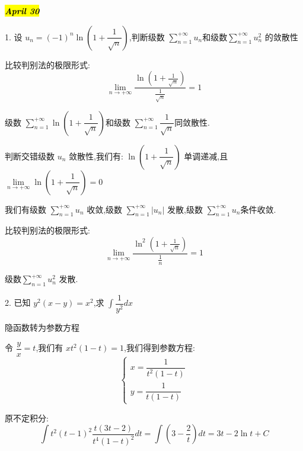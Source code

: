 
\hl{\textbf{\textit{April 30}}}

1. 设 $u_{n}=(-1)^{n}\ln(1+\dfrac{1}{\sqrt{n}})$,判断级数 $\sum\limits_{n=1}^{+\infty}u_{n}$和级数$\sum\limits_{n=1}^{+\infty}u^{2}_{n}$ 的敛散性
\begin{solution}
	
	比较判别法的极限形式: 
	$$\lim\limits_{n\rightarrow +\infty}\frac{\ln(1+\frac{1}{\sqrt{n}})}{\frac{1}{\sqrt{n}}}=1$$
	
	级数 $\sum\limits_{n=1}^{+\infty}\ln(1+\dfrac{1}{\sqrt{n}})$和级数 $\sum\limits_{n=1}^{+\infty}\dfrac{1}{\sqrt{n}}$同敛散性.
	
	判断交错级数 $u_{n}$ 敛散性,我们有: $\ln(1+\dfrac{1}{\sqrt{n}})$ 单调递减,且 $\lim\limits_{n\rightarrow+\infty}\ln(1+\dfrac{1}{\sqrt{n}})=0$
	
	我们有级数 $\sum\limits_{n=1}^{+\infty}u_{n}$ 收敛,级数 $\sum\limits_{n=1}^{+\infty}|u_{n}|$ 发散,级数 $\sum\limits_{n=1}^{+\infty}u_{n}$条件收敛.
	
	比较判别法的极限形式: 
	$$\lim\limits_{n\rightarrow +\infty}\frac{\ln^{2}(1+\frac{1}{\sqrt{n}})}{\frac{1}{n}}=1$$
	
	级数$\sum\limits_{n=1}^{+\infty}u^{2}_{n}$ 发散.
\end{solution}


2. 已知 $y^{2}(x-y)=x^2$,求 $\int\dfrac{1}{y^2}dx$ \label{problem: 隐函数转为参数方程}
\begin{solution}
	
	隐函数转为参数方程
	
	令 $\dfrac{y}{x}=t$,我们有 $xt^2(1-t)=1$,我们得到参数方程: 
	$$\left\lbrace\begin{array}{l}
		x=\dfrac{1}{t^2(1-t)}\\y=\dfrac{1}{t(1-t)}
	\end{array} \right. $$
	
	原不定积分:  
	$$ \int t^2(t-1)^2\frac{t(3t-2)}{t^4(1-t)^2}dt=\int(3-\frac{2}{t})dt=3t-2\ln t+C$$
\end{solution}

